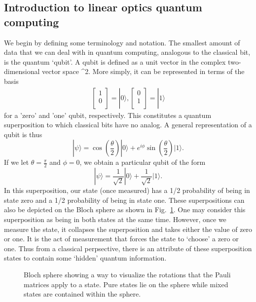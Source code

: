 \documentclass[aps,pra,twocolumn,amsmath,amssymb,nofootinbib,superscriptaddress]{revtex4}
\newcommand{\ket}[1]{|#1\rangle}
\begin{document}
\subsection{Introduction to linear optics quantum computing}
 
 We begin by defining some terminology and notation. The smallest amount of data that we can deal with in quantum computing, analogous to the classical bit, is the quantum `qubit'. A qubit is defined as a unit vector in the complex two-dimensional vector space ^2.  More simply, it can be represented in terms of the basis
\begin{eqnarray}
 \left[ \begin{array}{l}
1 \\
0 \\
\end{array} \right] = \ket{0},
\left[ \begin{array}{l}
0 \\
1 \\
\end{array} \right] = \ket{1}
\end{eqnarray}
for a 'zero' and 'one' qubit, respectively.  This constitutes a quantum superposition to which classical bits have no analog.  A general representation of a qubit is thus
\begin{equation}
\ket{\psi} = \cos\left(\frac{\theta}{2}\right) \ket{0} + e^{i \phi} \sin\left(\frac{\theta}{2}\right)\ket{1}.
\end{equation}
 If we let $\theta =\frac{\pi}{2}$ and $\phi =0$, we obtain a particular qubit of the form
\begin{equation}
\ket{\psi}= \frac{1}{\sqrt{2}} \ket{0} + \frac{1}{\sqrt{2}} \ket{1}.
\end{equation}
In this superposition, our state (once measured) has a 1/2 probability of being in state zero and a 1/2 probability of being in state one. These superpositions can also be depicted on the Bloch sphere as shown in Fig.~\ref{fig:Bloch}. One may consider this superposition as being in both states at the same time.  However, once we measure the state, it collapses the superposition and takes either the value of zero or one. It is the act of measurement that forces the state to `choose' a zero or one. Thus from a classical perpsective, there is an attribute of these superposition states to contain some `hidden' quantum information.
\begin{figure}[bt]
 \centering
  \caption{ Bloch sphere showing a way to visualize the rotations that the Pauli matrices apply to a state. Pure states lie on the sphere while mixed states are contained within the sphere.}
  \label{fig:Bloch}
\end{figure}
\end{document}
